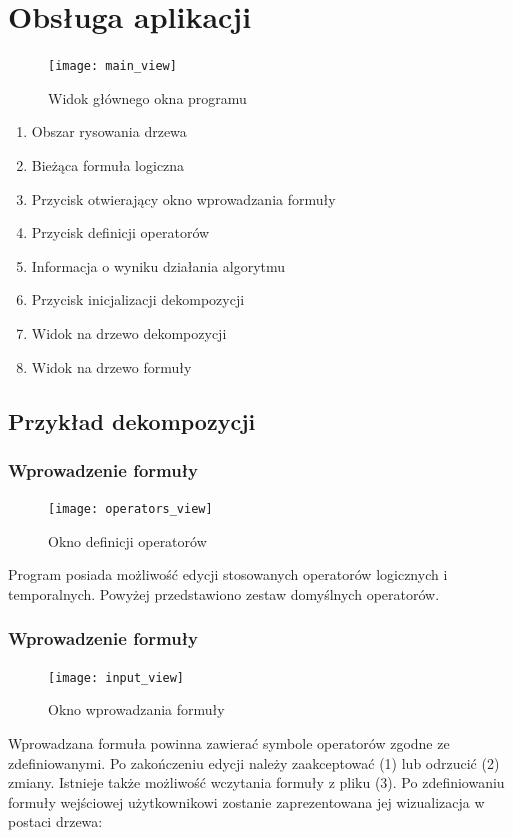 \documentclass[12pt,a4paper,titlepage]{article}
\begin{document}
\section{Obsługa aplikacji}

\begin{figure}[H]
\centering
\texttt{[image: main\_view]}
\caption{Widok głównego okna programu}
\end{figure}

\begin{enumerate}
	\item Obszar rysowania drzewa
	\item Bieżąca formuła logiczna
	\item Przycisk otwierający okno wprowadzania formuły
	\item Przycisk definicji operatorów
	\item Informacja o wyniku działania algorytmu
	\item Przycisk inicjalizacji dekompozycji
	\item Widok na drzewo dekompozycji
	\item Widok na drzewo formuły
\end{enumerate}

\subsection{Przykład dekompozycji}

\subsubsection{Wprowadzenie formuły}
\begin{figure}[H]
\centering
\texttt{[image: operators\_view]}
\caption{Okno definicji operatorów}
\end{figure}

Program posiada możliwość edycji stosowanych operatorów logicznych i temporalnych. Powyżej przedstawiono zestaw domyślnych operatorów.

\subsubsection{Wprowadzenie formuły}
\begin{figure}[H]
\centering
\texttt{[image: input\_view]}
\caption{Okno wprowadzania formuły}
\end{figure}

Wprowadzana formuła powinna zawierać symbole operatorów zgodne ze zdefiniowanymi. Po zakończeniu edycji należy zaakceptować (1) lub odrzucić (2) zmiany. Istnieje także możliwość wczytania formuły z pliku (3). Po zdefiniowaniu formuły wejściowej użytkownikowi zostanie zaprezentowana jej wizualizacja w postaci drzewa:
\end{document}
